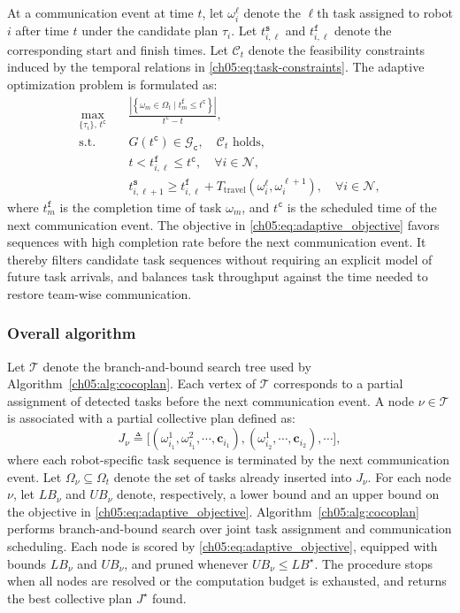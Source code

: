 At a communication event at time $t$, let $\omega_i^\ell$ denote the $\ell$th
task assigned to robot $i$ after time $t$ under the candidate plan $\tau_i$.
Let $t_{i,\ell}^{\texttt{s}}$ and $t_{i,\ell}^{\texttt{f}}$ denote the
corresponding start and finish times. Let $\mathcal{C}_t$ denote the
feasibility constraints induced by the temporal relations in
\eqref{ch05:eq:task-constraints}.
The adaptive optimization problem is formulated as:
\begin{equation}
\begin{aligned}
\max_{\{\tau_i\},\, t^{\texttt{c}}} \quad &
\frac{
\left|
\left\{
\omega_m \in \Omega_t \mid t_m^{\texttt{f}} \leq t^{\texttt{c}}
\right\}
\right|
}{
t^{\texttt{c}} - t
},
\\
\text{s.t.} \quad &
G(t^{\texttt{c}}) \in \mathcal{G}_{\texttt{c}},
\quad \mathcal{C}_t \text{ holds},
\\
&
t < t_{i,\ell}^{\texttt{f}} \leq t^{\texttt{c}},
\quad \forall i \in \mathcal{N},
\\
&
t_{i,\ell+1}^{\texttt{s}}
\geq t_{i,\ell}^{\texttt{f}}
+ T_{\text{travel}}(\omega_i^\ell, \omega_i^{\ell+1}),
\quad \forall i \in \mathcal{N},
\end{aligned}
\label{ch05:eq:adaptive_objective}
\end{equation}
where $t_m^{\texttt{f}}$ is the completion time of task $\omega_m$, and
$t^{\texttt{c}}$ is the scheduled time of the next communication event.
The objective in \eqref{ch05:eq:adaptive_objective} favors sequences with high
completion rate before the next communication event. It thereby filters
candidate task sequences without requiring an explicit model of future task
arrivals, and balances task throughput against the time needed to restore
team-wise communication.

\subsubsection{Overall algorithm}
\label{ch05:subsubsec:algorithm-description}

Let $\mathcal{T}$ denote the branch-and-bound search tree used by
Algorithm~\ref{ch05:alg:cocoplan}. Each vertex of $\mathcal{T}$ corresponds to
a partial assignment of detected tasks before the next communication event. A
node $\nu \in \mathcal{T}$ is associated with a partial collective plan defined as:
\[
J_\nu \triangleq
\bigl[
(\omega_{i_1}^1, \omega_{i_1}^2, \cdots, \mathbf{c}_{i_1}),
(\omega_{i_2}^1, \cdots, \mathbf{c}_{i_2}),
\cdots
\bigr],
\]
where each robot-specific task sequence is terminated by the next
communication event. Let $\Omega_\nu \subseteq \Omega_t$ denote the set of
tasks already inserted into $J_\nu$. For each node $\nu$, let $LB_\nu$ and
$UB_\nu$ denote, respectively, a lower bound and an upper bound on the
objective in \eqref{ch05:eq:adaptive_objective}.
Algorithm~\ref{ch05:alg:cocoplan} performs branch-and-bound search over joint
task assignment and communication scheduling. Each node is scored by
\eqref{ch05:eq:adaptive_objective}, equipped with bounds $LB_\nu$ and $UB_\nu$,
and pruned whenever $UB_\nu \leq LB^\star$. The procedure stops when all nodes
are resolved or the computation budget is exhausted, and returns the best
collective plan $J^\star$ found.

